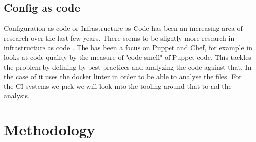 \documentclass[twoside,12pt,titlepage,a4paper]{article}
\begin{document}
\vspace*{-0.05in}
\subsection{Config as code}
\vspace*{-0.05in}

Configuration as code or Infrastructure as Code has been an increasing area of research over the last few years. There seems to be slightly more research in infrastructure as code \citet{Rahman2019}. The has been a focus on Puppet and Chef, for example in \citet{Sharma2016} looks at code quality by the measure of "code smell" of Puppet code. This tackles the problem by defining by best practices and analyzing the code against that. In the case of \citet{Cito2017} it uses the docker linter in order to be able to analyse the files. 
For the CI systems we pick we will look into the tooling around that to aid the analysis.


\section{Methodology}
\label{methodology}


\end{document}
